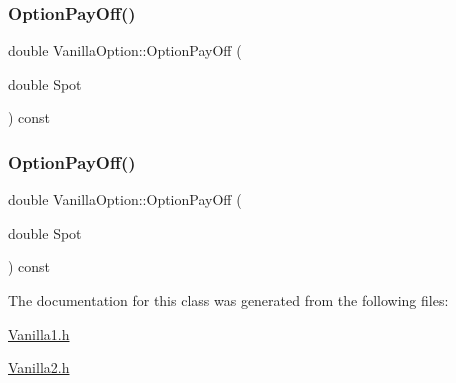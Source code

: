 \hypertarget{classVanillaOption_af7f88627dec1267761a02bab1fc1c535}{}\label{classVanillaOption_af7f88627dec1267761a02bab1fc1c535} 
\subsubsection{\texorpdfstring{Option\+Pay\+Off()}{OptionPayOff()}\hspace{0.1cm}{\footnotesize\ttfamily [1/2]}}
{\footnotesize\ttfamily double Vanilla\+Option\+::\+Option\+Pay\+Off (\begin{DoxyParamCaption}\item[{double}]{Spot }\end{DoxyParamCaption}) const}

\hypertarget{classVanillaOption_af7f88627dec1267761a02bab1fc1c535}{}\label{classVanillaOption_af7f88627dec1267761a02bab1fc1c535} 
\subsubsection{\texorpdfstring{Option\+Pay\+Off()}{OptionPayOff()}\hspace{0.1cm}{\footnotesize\ttfamily [2/2]}}
{\footnotesize\ttfamily double Vanilla\+Option\+::\+Option\+Pay\+Off (\begin{DoxyParamCaption}\item[{double}]{Spot }\end{DoxyParamCaption}) const}



The documentation for this class was generated from the following files\+:\begin{DoxyCompactItemize}
\item 
\hyperlink{Vanilla1_8h}{Vanilla1.\+h}\item 
\hyperlink{Vanilla2_8h}{Vanilla2.\+h}\end{DoxyCompactItemize}
